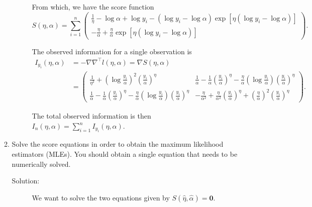 \documentclass[letterpaper,11pt]{article}
\begin{document}
\begin{enumerate}
\begin{enumerate}
\begin{description}
    From which, we have the score function
    \begin{equation*}
      S\left(\eta,\alpha\right) = \sum_{i=1}^n
      \begin{pmatrix}
        \frac{1}{\eta} - \log\alpha + \log y_i -
        \left(\log y_i - \log\alpha\right)
        \exp\left[\eta\left(\log y_i - \log\alpha\right)\right]
        \\
        -\frac{\eta}{\alpha}
        +\frac{\eta}{\alpha}\exp\left[\eta\left(\log y_i - \log\alpha\right)\right]
      \end{pmatrix}.
    \end{equation*}

    The observed information for a single observation is
    \begin{align*}
      I_{y_i}\left(\eta, \alpha\right)
      &= -\nabla \nabla^\intercal l\left(\eta,\alpha\right) = \nabla S\left(\eta,\alpha\right) \\
      &= \begin{pmatrix}
        \frac{1}{\eta^2} + \left(\log \frac{y_i}{\alpha}\right)^2
        \left(\frac{y_i}{\alpha}\right)^\eta
        &
        \frac{1}{\alpha} - \frac{1}{\alpha}\left(\frac{y_i}{\alpha}\right)^\eta -
        \frac{\eta}{\alpha}\left(\log \frac{y_i}{\alpha}\right)\left(\frac{y_i}{\alpha}\right)^\eta
        \\
        \frac{1}{\alpha} - \frac{1}{\alpha}\left(\frac{y_i}{\alpha}\right)^\eta -
        \frac{\eta}{\alpha}\left(\log \frac{y_i}{\alpha}\right)\left(\frac{y_i}{\alpha}\right)^\eta
        &
        -\frac{\eta}{\alpha^2} + \frac{\eta}{\alpha^2}\left(\frac{y_i}{\alpha}\right)^\eta
        + \left(\frac{\eta}{\alpha}\right)^2\left(\frac{y_i}{\alpha}\right)^\eta
      \end{pmatrix}.
    \end{align*}

    The total observed information is then $\displaystyle
    I_n\left(\eta,\alpha\right) = \sum_{i=1}^nI_{y_i}\left(\eta,\alpha\right)$.
  \end{description}
  
\item Solve the score equations in order to obtain the maximum likelihood
  estimators (MLEs). You should obtain a single equation that needs to be
  numerically solved.

  \begin{description}
  \item[Solution:] We want to solve the two equations given by
    $S\left(\hat{\eta}, \hat{\alpha}\right) = \mathbf{0}$.


\end{description}
\end{enumerate}
\end{enumerate}
\end{document}
